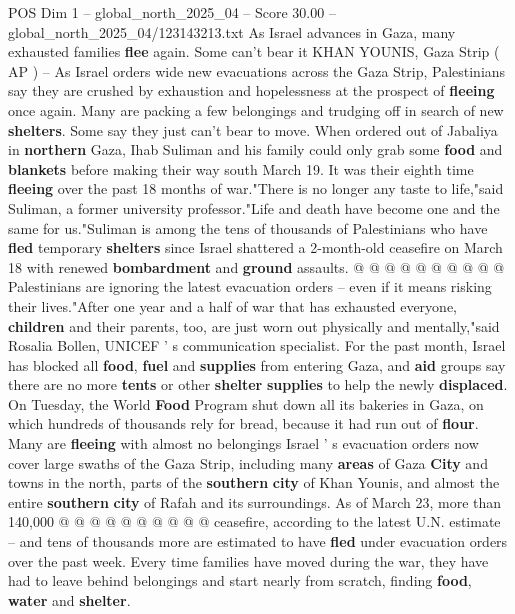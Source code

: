 \begin{textsample}{POS Dim 1 – global\_north\_2025\_04 – Score 30.00 – global\_north\_2025\_04/123143213.txt}  \label{ex:f1_pos_349}
As Israel advances in Gaza, many exhausted families \textbf{flee} again.
Some can't bear it KHAN YOUNIS, Gaza Strip ( AP ) -- As Israel orders wide new evacuations across the Gaza Strip, Palestinians say they are crushed by exhaustion and hopelessness at the prospect of \textbf{fleeing} once again.
Many are packing a few belongings and trudging off in search of new \textbf{shelters}.
Some say they just can't bear to move.
When ordered out of Jabaliya in \textbf{northern} Gaza, Ihab Suliman and his family could only grab some \textbf{food} and \textbf{blankets} before making their way south March 19.
It was their eighth time \textbf{fleeing} over the past 18 months of war."There is no longer any taste to life,"said Suliman, a former university professor."Life and death have become one and the same for us."Suliman is among the tens of thousands of Palestinians who have \textbf{fled} temporary \textbf{shelters} since Israel shattered a 2-month-old ceasefire on March 18 with renewed \textbf{bombardment} and \textbf{ground} assaults. @ @ @ @ @ @ @ @ @ @ Palestinians are ignoring the latest evacuation orders -- even if it means risking their lives."After one year and a half of war that has exhausted everyone, \textbf{children} and their parents, too, are just worn out physically and mentally,"said Rosalia Bollen, UNICEF ' s communication specialist.
For the past month, Israel has blocked all \textbf{food}, \textbf{fuel} and \textbf{supplies} from entering Gaza, and \textbf{aid} groups say there are no more \textbf{tents} or other \textbf{shelter} \textbf{supplies} to help the newly \textbf{displaced}.
On Tuesday, the World \textbf{Food} Program shut down all its bakeries in Gaza, on which hundreds of thousands rely for bread, because it had run out of \textbf{flour}.
Many are \textbf{fleeing} with almost no belongings Israel ' s evacuation orders now cover large swaths of the Gaza Strip, including many \textbf{areas} of Gaza \textbf{City} and towns in the north, parts of the \textbf{southern} \textbf{city} of Khan Younis, and almost the entire \textbf{southern} \textbf{city} of Rafah and its surroundings.
As of March 23, more than 140,000 @ @ @ @ @ @ @ @ @ @ ceasefire, according to the latest U.N. estimate -- and tens of thousands more are estimated to have \textbf{fled} under evacuation orders over the past week.
Every time families have moved during the war, they have had to leave behind belongings and start nearly from scratch, finding \textbf{food}, \textbf{water} and \textbf{shelter}.

\end{textsample}
